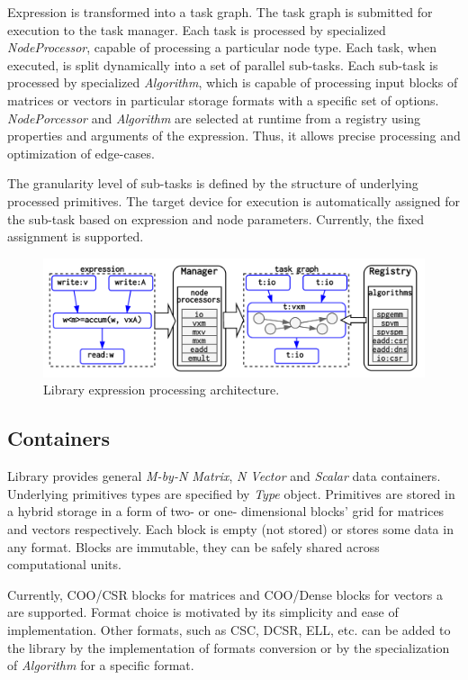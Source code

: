 Expression is transformed into a task graph. 
The task graph is submitted for execution to the task manager. 
Each task is processed by specialized \textit{NodeProcessor}, capable of processing a particular node type.
Each task, when executed, is split dynamically into a set of parallel sub-tasks. 
Each sub-task is processed by specialized \textit{Algorithm}, which is capable of processing input blocks of matrices or vectors in particular storage formats with a specific set of options. \textit{NodePorcessor} and \textit{Algorithm} are selected at runtime from a registry using properties and arguments of the expression. 
Thus, it allows precise processing and optimization of edge-cases.

The granularity level of sub-tasks is defined by the structure of underlying processed primitives. 
The target device for execution is automatically assigned for the sub-task based on expression and node parameters. 
Currently, the fixed assignment is supported.

\begin{figure}[t]
\includegraphics[width=\linewidth]{architecture.png}
\caption{Library expression processing architecture.}
\label{fig:architecture}
\end{figure}
    
\subsection{Containers}

Library provides general \textit{M-by-N Matrix}, \textit{N Vector} and \textit{Scalar} data containers.
Underlying primitives types are specified by \textit{Type} object. 
Primitives are stored in a hybrid storage in a form of two- or one- dimensional blocks' grid for matrices and vectors respectively. 
Each block is empty (not stored) or stores some data in any format. Blocks are immutable, they can be safely shared across computational units.

Currently, COO/CSR blocks for matrices and COO/Dense blocks for vectors a are supported. Format choice is motivated by its simplicity and ease of implementation. 
Other formats, such as CSC, DCSR, ELL, etc. can be added to the library by the implementation of formats conversion or by the specialization of \textit{Algorithm} for a specific format.

